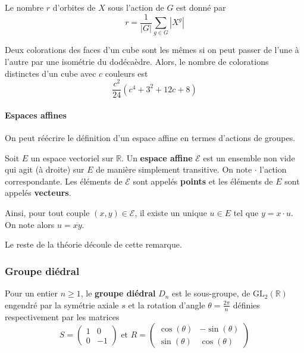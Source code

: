 	\begin{theorem}
		Le nombre $r$ d'orbites de $X$ sous l'action de $G$ est donné par
		\[ r = \frac{1}{|G|} \sum_{g \in G} |X^g| \]
	\end{theorem}
	
	
	\begin{application}
		Deux colorations des faces d'un cube sont les mêmes si on peut passer de l'une à l'autre par une isométrie du dodécaèdre. Alors, le nombre de colorations distinctes d'un cube avec $c$ couleurs est
		\[ \frac{c^2}{24} (c^4 + 3^2 + 12c + 8) \]
	\end{application}
	
	\paragraph{Espaces affines}
	
	
	On peut réécrire le définition d'un espace affine en termes d'actions de groupes.
	
	\begin{definition}
		Soit $E$ un espace vectoriel sur $\mathbb{R}$. Un \textbf{espace affine} $\mathcal{E}$ est un ensemble non vide qui agit (à droite) sur $E$ de manière simplement transitive. On note $\cdot$ l'action correspondante. Les éléments de $\mathcal{E}$ sont appelés \textbf{points} et les éléments de $E$ sont appelés \textbf{vecteurs}.
	\end{definition}
	
	\begin{remark}
		Ainsi, pour tout couple $(x,y) \in \mathcal{E}$, il existe un unique $u \in E$ tel que $y = x \cdot u$. On note alors $u = \overline{xy}$.
	\end{remark}
	
	Le reste de la théorie découle de cette remarque.
	
	\subsubsection{Groupe diédral}
	
	
	\begin{definition}
		Pour un entier $n \geq 1$, le \textbf{groupe diédral} $D_n$ est le sous-groupe, de $\mathrm{GL}_2(\mathbb{R})$ engendré par la symétrie axiale $s$ et la rotation d'angle $\theta = \frac{2\pi}{n}$ définies respectivement par les matrices
		\[
		S =
		\begin{pmatrix}
			1 & 0 \\
			0 & -1
		\end{pmatrix}
		\text{ et }
		R =
		\begin{pmatrix}
			\cos(\theta) & -\sin(\theta) \\
			\sin(\theta) & \cos(\theta)
		\end{pmatrix}
		\]
	\end{definition}
	
